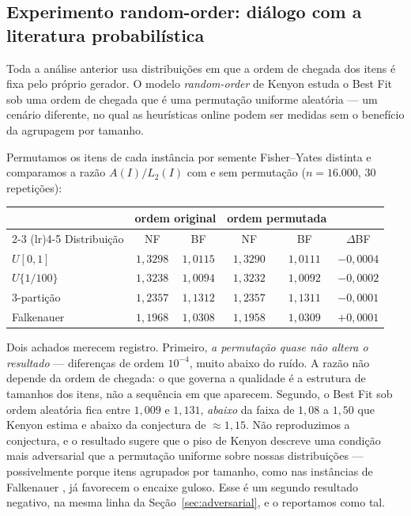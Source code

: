 \documentclass[12pt]{article}
\begin{document}
\subsection{Experimento random-order: diálogo com a literatura probabilística} \label{sec:random}

Toda a análise anterior usa distribuições em que a ordem de chegada dos itens é fixa pelo próprio gerador. O modelo \textit{random-order} de Kenyon \cite{kenyon1996} estuda o Best Fit sob uma ordem de chegada que é uma permutação uniforme aleatória --- um cenário diferente, no qual as heurísticas online podem ser medidas sem o benefício da agrupagem por tamanho.

Permutamos os itens de cada instância por semente Fisher--Yates distinta e comparamos a razão $A(I)/L_2(I)$ com e sem permutação ($n = 16.000$, $30$ repetições):

\begin{center}
\begin{tabular}{@{}lccccc@{}}
\toprule
& \multicolumn{2}{c}{ordem original} & \multicolumn{2}{c}{ordem permutada} & \\ 
\cmidrule(lr){2-3} \cmidrule(lr){4-5}
Distribuição & NF & BF & NF & BF & $\Delta$BF \\
\midrule
$U[0,1]$ & $1{,}3298$ & $1{,}0115$ & $1{,}3290$ & $1{,}0111$ & $-0{,}0004$ \\
$U\{1/100\}$ & $1{,}3238$ & $1{,}0094$ & $1{,}3232$ & $1{,}0092$ & $-0{,}0002$ \\
3-partição & $1{,}2357$ & $1{,}1312$ & $1{,}2357$ & $1{,}1311$ & $-0{,}0001$ \\
Falkenauer & $1{,}1968$ & $1{,}0308$ & $1{,}1958$ & $1{,}0309$ & $+0{,}0001$ \\
\bottomrule
\end{tabular}
\end{center}

Dois achados merecem registro. Primeiro, \emph{a permutação quase não altera o resultado} --- diferenças de ordem $10^{-4}$, muito abaixo do ruído. A razão não depende da ordem de chegada: o que governa a qualidade é a estrutura de tamanhos dos itens, não a sequência em que aparecem. Segundo, o Best Fit sob ordem aleatória fica entre $1{,}009$ e $1{,}131$, \emph{abaixo} da faixa de $1{,}08$ a $1{,}50$ que Kenyon \cite{kenyon1996} estima e abaixo da conjectura de $\approx 1{,}15$. Não reproduzimos a conjectura, e o resultado sugere que o piso de Kenyon descreve uma condição mais adversarial que a permutação uniforme sobre nossas distribuições --- possivelmente porque itens agrupados por tamanho, como nas instâncias de Falkenauer \cite{falkenauer1996}, já favorecem o encaixe guloso. Esse é um segundo resultado negativo, na mesma linha da Seção~\ref{sec:adversarial}, e o reportamos como tal.
\end{document}
